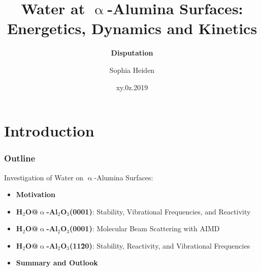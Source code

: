 \documentclass[hyperref={pdfpagelabels=false}]{beamer}
\begin{document}
\title{Water at $\upalpha$-Alumina Surfaces: Energetics, Dynamics and Kinetics}
\subtitle{{\bf Disputation}}   
\author{Sophia Heiden}
\date{xy.0z.2019}

\begin{frame}[plain]
 \addtocounter{framenumber}{-2}
\titlepage
\end{frame} 

\section[]{Introduction}
\begin{frame}[plain]
\frametitle{Outline}
 Investigation of Water on $\upalpha$-Alumina Surfaces: \newline 
\begin{itemize}
 \item \textbf{Motivation}
 \item \textbf{H$_2$O@$\upalpha$-Al$_2$O$_3$(0001)}: Stability, Vibrational Frequencies, and Reactivity
 \item \textbf{H$_2$O@$\upalpha$-Al$_2$O$_3$(0001)}: Molecular Beam Scattering with AIMD
 \item \textbf{H$_2$O@$\upalpha$-Al$_2$O$_3$(11\=20)}: Stability, Reactivity, and Vibrational Frequencies
 \item \textbf{Summary and Outlook}
 \end{itemize}
\end{frame}
\end{document}
